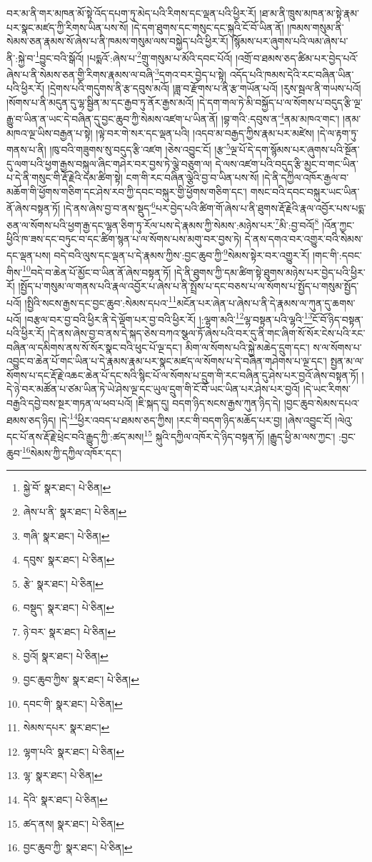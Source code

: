 བར་མ་ནི་གར་མཁན་མོ་སྟེ་འོད་དཔག་ཏུ་མེད་པའི་རིགས་དང་ལྡན་པའི་ཕྱིར་རོ། །ཐ་མ་ནི་ཁྲུས་མཁན་མ་སྟེ་རྣམ་པར་སྣང་མཛད་ཀྱི་རིགས་ཡིན་པས་སོ། །དེ་དག་ཐུགས་དང་གསུང་དང་སྐུའི་ངོ་བོ་ཡིན་ནོ། །ཁམས་གསུམ་ནི་སེམས་ཅན་རྣམས་སོ་ཞེས་པ་ནི་ཁམས་གསུམ་ལས་བསྐྱེད་པའི་ཕྱིར་རོ། །སྙོམས་པར་ཞུགས་པའི་ལམ་ཞེས་པ་ནི་:སྐྱེ་བ་\footnote{སྐྱེ་བོ་  སྣར་ཐང་།  པེ་ཅིན། }བྱུང་བའི་སྒོའོ། །པདྨའོ་:ཞེས་པ་\footnote{ཞེས་པ་ནི་  སྣར་ཐང་།  པེ་ཅིན། }གྲུ་གསུམ་པ་མོའི་དབང་པོའོ། །འགྲོ་བ་ཐམས་ཅད་ཚིམ་པར་བྱེད་པའོ་ཞེས་པ་ནི་སེམས་ཅན་གྱི་རིགས་རྣམས་ལ་བཞི་\footnote{གཞི་  སྣར་ཐང་།  པེ་ཅིན། }དགའ་བར་བྱེད་པ་སྟེ། འདོད་པའི་ཁམས་དེའི་རང་བཞིན་ཡིན་པའི་ཕྱིར་རོ། །དྲེགས་པའི་གདུགས་ནི་རྩ་དབུས་མའོ། །ཟླ་བ་རྫོགས་པ་ནི་རྩ་གཡོན་པའོ། །རུས་སྦལ་ནི་གཡས་པའོ། །སོགས་པ་ནི་མདུན་དུ་ལྷ་སྦྱིན་མ་དང་རྒྱབ་ཏུ་ནོར་རྒྱས་མའོ། །དེ་དག་གལ་ཏེ་མི་བསྐྱོད་པ་ལ་སོགས་པ་བདུད་རྩི་ལྔ་རྒྱུ་བ་ཡིན་ན་ཡང་དེ་བཞིན་དུ་བྱང་ཆུབ་ཀྱི་སེམས་འཛག་པ་ཡིན་ནོ། །བྷ་གའི་:དབུས་ན་\footnote{དབུས་  སྣར་ཐང་།  པེ་ཅིན། }ནམ་མཁའ་གང་། །ནམ་མཁའ་ལྔ་ཡིས་བརྒྱན་པ་སྟེ། །ལྟེ་བར་གེ་སར་དང་ལྡན་པའི། །འདབ་མ་བརྒྱད་ཀྱིས་རྣམ་པར་མཛེས། །དེ་ལ་རྟག་ཏུ་གནས་པ་ནི། །ཁུ་བའི་གཟུགས་སུ་བདུད་རྩི་འཛག །ཅེས་འབྱུང་ངོ། །རྩ་\footnote{རྩེ་  སྣར་ཐང་།  པེ་ཅིན། }ལྔ་པོ་དེ་དག་སྙོམས་པར་ཞུགས་པའི་སྔོན་དུ་ལག་པའི་ཕྱག་རྒྱས་བསྐུལ་ཞིང་གཤེར་བར་བྱས་ཏེ་ལྕེ་བཅུག་ལ། དེ་ལས་འཛག་པའི་བདུད་རྩི་མྱང་བ་གང་ཡིན་པ་དེ་ནི་གསུང་གི་རྡོ་རྗེའི་དམ་ཚིག་སྟེ། ངག་གི་རང་བཞིན་ལྕེའི་བྱ་བ་ཡིན་པས་སོ། །དེ་ནི་དཀྱིལ་འཁོར་རྒྱལ་བ་མཆོག་གི་ཕྱོགས་གཅིག་དང་ཤེས་རབ་ཀྱི་དབང་བསྐུར་གྱི་ཕྱོགས་གཅིག་དང་། གསང་བའི་དབང་བསྐུར་ཡང་ཡིན་ནོ་ཞེས་བསྟན་ཏོ། །དེ་ནས་ཞེས་བྱ་བ་ནས་སྡུད་\footnote{བསྡུད་  སྣར་ཐང་།  པེ་ཅིན། }པར་བྱེད་པའི་ཚིག་གོ་ཞེས་པ་ནི་ཐུགས་རྡོ་རྗེའི་རྣལ་འབྱོར་པས་པདྨ་ཅན་ལ་སོགས་པའི་ཕྱག་རྒྱ་དང་ལྷན་ཅིག་ཏུ་རོལ་པས་དེ་རྣམས་ཀྱི་སེམས་:མཉེས་པར་\footnote{ཉེ་བར་  སྣར་ཐང་།  པེ་ཅིན། }མི་:བྱ་བའོ།\footnote{བྱའོ།  སྣར་ཐང་།  པེ་ཅིན། } །འོན་ཀྱང་ཕྱིའི་ཁ་ཟས་དང་བཏུང་བ་དང་ཚིག་སྙན་པ་ལ་སོགས་པས་མགུ་བར་བྱས་ཏེ། དེ་ནས་དགའ་བར་འགྱུར་བའི་སེམས་དང་ལྡན་པས། བདེ་བའི་ལུས་དང་ལྡན་པ་དེ་རྣམས་ཀྱིས་:བྱང་ཆུབ་ཀྱི་\footnote{བྱང་ཆུབ་ཀྱིས་  སྣར་ཐང་།  པེ་ཅིན། }སེམས་སྟེར་བར་འགྱུར་རོ། །གང་གི་:དབང་གིས་\footnote{དབང་གི་  སྣར་ཐང་།  པེ་ཅིན། }བདེ་བ་ཆེན་པོ་མྱོང་བ་ཡིན་ནོ་ཞེས་བསྟན་ཏོ། །དེ་ནི་ཐུགས་ཀྱི་དམ་ཚིག་སྟེ་ཐུགས་མཉེས་པར་བྱེད་པའི་ཕྱིར་རོ། །སྤྱོད་པ་གསུམ་ལ་གནས་པའི་རྣལ་འབྱོར་པ་ཞེས་པ་ནི་སྤྲོས་པ་དང་བཅས་པ་ལ་སོགས་པ་སྤྱོད་པ་གསུམ་སྤྱོད་པའོ། །སྤྱིའི་སངས་རྒྱས་དང་བྱང་ཆུབ་:སེམས་དཔའ་\footnote{སེམས་དཔར་  སྣར་ཐང་། }མངོན་པར་ཞེན་པ་ཞེས་པ་ནི་དེ་རྣམས་ལ་ཀུན་དུ་ཆགས་པའོ། །བརྩལ་བར་བྱ་བའི་ཕྱིར་ནི་དེ་ལྡོག་པར་བྱ་བའི་ཕྱིར་རོ། །:ལྷག་མའི་\footnote{ལྷག་པའི་  སྣར་ཐང་།  པེ་ཅིན། }ལྷ་བསྟན་པའི་ལྷའི་\footnote{ལྷ་  སྣར་ཐང་།  པེ་ཅིན། }ངོ་བོ་ཉིད་བསྟན་པའི་ཕྱིར་རོ། །དེ་ནས་ཞེས་བྱ་བ་ནས་དེ་སྐད་ཅེས་བཀའ་སྩལ་ཏོ་ཞེས་པའི་བར་དུ་ནི་གང་ཞིག་སོ་སོར་ངེས་པའི་རང་བཞིན་ལ་དམིགས་ནས་སོ་སོར་སྣང་བའི་ཕུང་པོ་ལྔ་དང་། མིག་ལ་སོགས་པའི་སྐྱེ་མཆེད་དྲུག་དང་། ས་ལ་སོགས་པ་འབྱུང་བ་ཆེན་པོ་གང་ཡིན་པ་དེ་རྣམས་རྣམ་པར་སྣང་མཛད་ལ་སོགས་པ་དེ་བཞིན་གཤེགས་པ་ལྔ་དང་། སྤྱན་མ་ལ་སོགས་པ་དང་རྡོ་རྗེ་འཆང་ཆེན་པོ་དང་སའི་སྙིང་པོ་ལ་སོགས་པ་དྲུག་གི་རང་བཞིན་དུ་ཤེས་པར་བྱའོ་ཞེས་བསྟན་ཏོ། །དེ་ཉེ་བར་མཚོན་པ་ཙམ་ཡིན་ཏེ་ཡེ་ཤེས་ལྔ་དང་ཡུལ་དྲུག་གི་ངོ་བོ་ཡང་ཡིན་པར་ཤེས་པར་བྱའོ། །དེ་ཡང་རིགས་བརྒྱའི་དབྱེ་བས་སྔར་གཏན་ལ་ཕབ་པའོ། །ཇི་སྐད་དུ། བདག་ཉིད་སངས་རྒྱས་ཀུན་ཉིད་དེ། །བྱང་ཆུབ་སེམས་དཔའ་ཐམས་ཅད་ཉིད། །དེ་\footnote{དེའི་  སྣར་ཐང་།  པེ་ཅིན། }ཕྱིར་འབད་པ་ཐམས་ཅད་ཀྱིས། །རང་གི་བདག་ཉིད་མཆོད་པར་བྱ། །ཞེས་འབྱུང་ངོ། །ལེའུ་དང་པོ་ནས་རྡོ་རྗེ་ཕྲེང་བའི་རྒྱུད་ཀྱི་:ཚད་མས།\footnote{ཚད་ནས།  སྣར་ཐང་།  པེ་ཅིན། } སྐུའི་དཀྱིལ་འཁོར་དེ་ཉིད་བསྟན་ཏོ། །རྒྱུད་ཕྱི་མ་ལས་ཀྱང་། :བྱང་ཆུབ་\footnote{བྱང་ཆུབ་ཀྱི་  སྣར་ཐང་།  པེ་ཅིན། }སེམས་ཀྱི་དཀྱིལ་འཁོར་དང་། 
